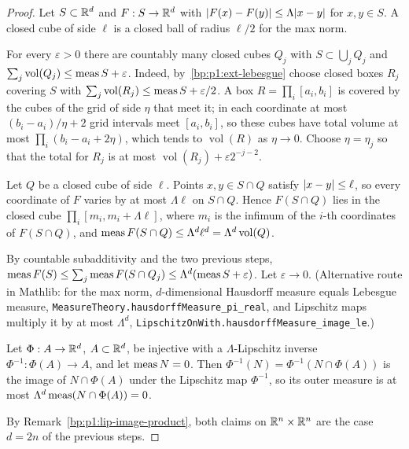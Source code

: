 \begin{proof}
Let $S\subset\mathbb{R}^d$ and $F:S\to\mathbb{R}^d$ with $\lvert F(x)-F(y)\rvert\le\Lambda\lvert x-y\rvert$ for $x,y\in S$. A closed cube
of side $\ell$ is a closed ball of radius $\ell/2$ for the max norm.

\label{step:p1:li-cubes}
For every $\varepsilon>0$ there are countably many closed cubes $Q_j$ with $S\subset\bigcup_jQ_j$ and
$\sum_j\operatorname{vol}(Q_j)\le\operatorname{meas} S+\varepsilon$. Indeed, by~\ref{bp:p1:ext-lebesgue} choose closed
boxes $R_j$ covering $S$ with $\sum_j\operatorname{vol}(R_j)\le\operatorname{meas} S+\varepsilon/2$. A box
$R=\prod_i[a_i,b_i]$ is covered by the cubes of the grid of side $\eta$ that meet it; in each coordinate
at most $(b_i-a_i)/\eta+2$ grid intervals meet $[a_i,b_i]$, so these cubes have total volume at most
$\prod_i(b_i-a_i+2\eta)$, which tends to $\operatorname{vol}(R)$ as $\eta\to0$. Choose $\eta=\eta_j$ so
that the total for $R_j$ is at most $\operatorname{vol}(R_j)+\varepsilon2^{-j-2}$.

\label{step:p1:li-image}
Let $Q$ be a closed cube of side $\ell$. Points $x,y\in S\cap Q$ satisfy $\lvert x-y\rvert\le\ell$, so every
coordinate of $F$ varies by at most $\Lambda\ell$ on $S\cap Q$. Hence $F(S\cap Q)$ lies in the closed cube
$\prod_i[m_i,m_i+\Lambda\ell]$, where $m_i$ is the infimum of the $i$-th coordinates of $F(S\cap Q)$, and
$\operatorname{meas} F(S\cap Q)\le\Lambda^d\ell^d=\Lambda^d\operatorname{vol}(Q)$.

\label{step:p1:li-sum}
By countable subadditivity and the two previous steps,
$\operatorname{meas} F(S)\le\sum_j\operatorname{meas} F(S\cap Q_j)\le\Lambda^d(\operatorname{meas} S+\varepsilon)$. Let $\varepsilon\to0$.
(Alternative route in Mathlib: for the max norm, $d$-dimensional Hausdorff measure equals Lebesgue
measure, \nolinkurl{MeasureTheory.hausdorffMeasure_pi_real}, and Lipschitz maps multiply it by at most
$\Lambda^d$, \nolinkurl{LipschitzOnWith.hausdorffMeasure_image_le}.)

\label{step:p1:li-preimage}
Let $\Phi:A\to\mathbb{R}^d$, $A\subset\mathbb{R}^d$, be injective with a $\Lambda$-Lipschitz inverse
$\Phi^{-1}:\Phi(A)\to A$, and let $\operatorname{meas} N=0$. Then $\Phi^{-1}(N)=\Phi^{-1}(N\cap\Phi(A))$ is the image of
$N\cap\Phi(A)$ under the Lipschitz map $\Phi^{-1}$, so its outer measure is at most
$\Lambda^d\operatorname{meas}(N\cap\Phi(A))=0$.

\label{step:p1:li-product}
By Remark~\ref{bp:p1:lip-image-product}, both claims on $\mathbb{R}^n\times\mathbb{R}^n$ are the case $d=2n$ of the
previous steps.
\end{proof}

